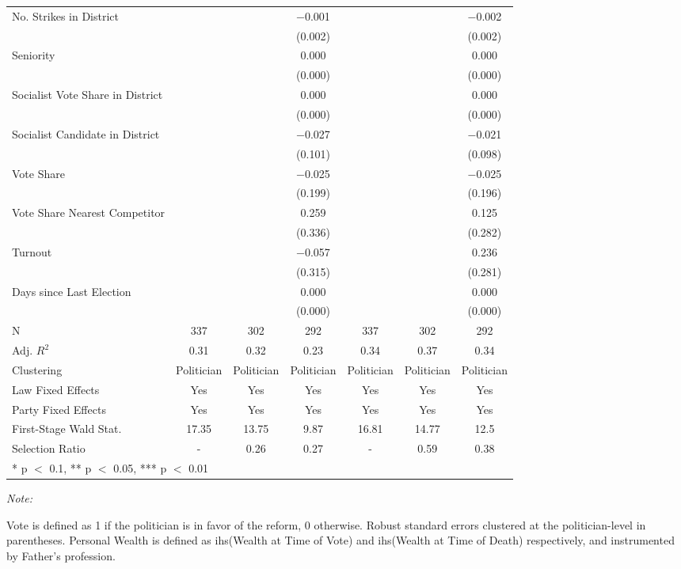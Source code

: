 \begin{table}[!h]
{\begin{threeparttable}
\begin{tabular}[t]{lcccccc}
No. Strikes in District &  &  & \num{-0.001} &  &  & \num{-0.002}\\
 &  &  & (\num{0.002}) &  &  & (\num{0.002})\\
Seniority &  &  & \num{0.000} &  &  & \num{0.000}\\
 &  &  & (\num{0.000}) &  &  & \vphantom{2} (\num{0.000})\\
Socialist Vote Share in District &  &  & \num{0.000} &  &  & \num{0.000}\\
 &  &  & (\num{0.000}) &  &  & \vphantom{1} (\num{0.000})\\
Socialist Candidate in District &  &  & \num{-0.027} &  &  & \num{-0.021}\\
 &  &  & (\num{0.101}) &  &  & (\num{0.098})\\
Vote Share &  &  & \num{-0.025} &  &  & \num{-0.025}\\
 &  &  & (\num{0.199}) &  &  & (\num{0.196})\\
Vote Share Nearest Competitor &  &  & \num{0.259} &  &  & \num{0.125}\\
 &  &  & (\num{0.336}) &  &  & (\num{0.282})\\
Turnout &  &  & \num{-0.057} &  &  & \num{0.236}\\
 &  &  & (\num{0.315}) &  &  & (\num{0.281})\\
Days since Last Election &  &  & \num{0.000} &  &  & \num{0.000}\\
 &  &  & (\num{0.000}) &  &  & (\num{0.000})\\
\midrule
N & \num{337} & \num{302} & \num{292} & \num{337} & \num{302} & \num{292}\\
Adj. $R^2$ & \num{0.31} & \num{0.32} & \num{0.23} & \num{0.34} & \num{0.37} & \num{0.34}\\
Clustering & Politician & Politician & Politician & Politician & Politician & Politician\\
Law Fixed Effects & Yes & Yes & Yes & Yes & Yes & Yes\\
Party Fixed Effects & Yes & Yes & Yes & Yes & Yes & Yes\\
First-Stage Wald Stat. & 17.35 & 13.75 & 9.87 & 16.81 & 14.77 & 12.5\\
Selection Ratio & - & 0.26 & 0.27 & - & 0.59 & 0.38\\
\bottomrule
\multicolumn{7}{l}{\rule{0pt}{1em}* p $<$ 0.1, ** p $<$ 0.05, *** p $<$ 0.01}\\
\end{tabular}
\begin{tablenotes}[para]
\item \textit{Note: } 
\item Vote is defined as 1 if the politician is in favor of the reform, 0 otherwise. Robust standard errors clustered at the politician-level in parentheses. Personal Wealth is defined as ihs(Wealth at Time of Vote) and ihs(Wealth at Time of Death) respectively, and instrumented by Father's profession.
\end{tablenotes}
\end{threeparttable}}
\end{table}
